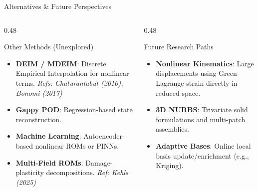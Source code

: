 \begin{frame}{Alternatives \& Future Perspectives}
  \small
  \begin{columns}[T]
    \begin{column}{0.48\textwidth}
      \begin{block}{Other Methods (Unexplored)}
        \footnotesize
        \begin{itemize}
          \setlength{\itemsep}{2pt}
          \item \textbf{DEIM / MDEIM}: Discrete Empirical Interpolation for nonlinear terms.
          \newline \textit{Refs: Chaturantabut (2010), Bonomi (2017)}
          \item \textbf{Gappy POD}: Regression-based state reconstruction.
          \item \textbf{Machine Learning}: Autoencoder-based nonlinear ROMs or PINNs.
          \item \textbf{Multi-Field ROMs}: Damage-plasticity decompositions. \textit{Ref: Kehls (2025)}
        \end{itemize}
      \end{block}
    \end{column}

    \begin{column}{0.48\textwidth}
      \begin{block}{Future Research Paths}
        \footnotesize
        \begin{itemize}
          \setlength{\itemsep}{2pt}
          \item \textbf{Nonlinear Kinematics}: Large displacements using Green-Lagrange strain directly in reduced space.
          \item \textbf{3D NURBS}: Trivariate solid formulations and multi-patch assemblies.
          \item \textbf{Adaptive Bases}: Online local basis update/enrichment (e.g., Kriging).
        \end{itemize}
      \end{block}
    \end{column}
  \end{columns}
\end{frame}
